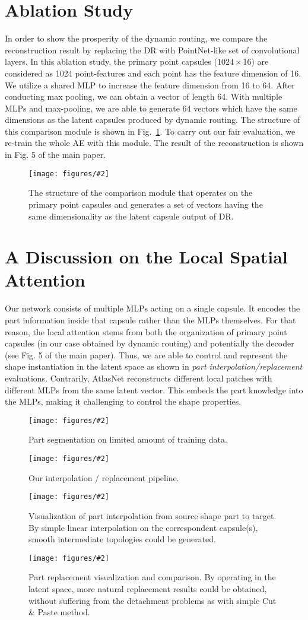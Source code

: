 \documentclass[10pt,twocolumn,letterpaper]{article}
\theoremstyle{break}
\newcommand{\insertimageC}[5]{ \begin{figure}[#5]
\centering
\texttt{[image: figures/\#2]}
\caption{#3}
\label{#4}
\end{figure}
}
\newcommand{\insertimageStar}[5]{ \begin{figure*}[#5]
\centering
\texttt{[image: figures/\#2]}
\caption{#3}
\label{#4}
\end{figure*}
}
\begin{document}
\section{Ablation Study}
In order to show the prosperity of the dynamic routing, we compare the reconstruction result by replacing the DR with PointNet-like set of convolutional layers. In this ablation study, the primary point capsules ($1024\times16$) are considered as 1024 point-features and each point has the feature dimension of 16. We utilize a shared MLP to increase the feature dimension from 16 to 64. After conducting max pooling, we can obtain a vector of length 64. With multiple MLPs and max-pooling, we are able to generate 64 vectors which have the same dimensions as the latent capsules produced by dynamic routing. The structure of this comparison module is shown in Fig.~\ref{fig:supp-convcompare}. To carry out our fair evaluation, we re-train the whole AE with this module. The result of the reconstruction is shown in Fig. 5 of the main paper.
\insertimageC{1}{conv_compare.pdf}{The structure of the comparison module that operates on the primary point capsules and generates a set of vectors having the same dimensionality as the latent capsule output of DR.}{fig:supp-convcompare}{hbtp}

\section{A Discussion on the Local Spatial Attention}
Our network consists of multiple MLPs acting on a single capsule. It encodes the part information inside that capsule rather than the MLPs themselves.
For that reason, the local attention stems from both the organization of primary point capsules (in our case obtained by dynamic routing) and potentially the decoder (see Fig. 5 of the main paper). Thus, we are able to control and represent the shape instantiation in the latent space as shown in \textit{part interpolation/replacement} evaluations. 
Contrarily, AtlasNet reconstructs different local patches with different MLPs from the same latent vector. This embeds the part knowledge into the MLPs, making it challenging to control the shape properties. 

\insertimageStar{1}{supp-part-seg01_cropped.pdf}{Part segmentation on limited amount of training data.}{fig:supp-partseg}{b!}
\insertimageStar{1}{pipeline-interp_cropped.pdf}{Our interpolation / replacement pipeline.}{fig:pipeline-interp}{hbtp}
\insertimageStar{1}{supp-interpolation_cropped.pdf}{Visualization of part interpolation from source shape part to target. By simple linear interpolation on the correspondent capsule(s), smooth intermediate topologies could be generated. }{fig:supp-partinterp}{hbtp}

\insertimageStar{1}{supp-part-rep01_cropped.pdf}{Part replacement visualization and comparison. By operating in the latent space, more natural replacement results could be obtained, without suffering from the detachment problems as with simple Cut \& Paste method.}{fig:supp-partrep}{hbtp} 
\end{document}
